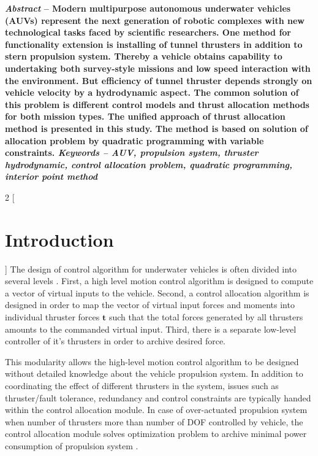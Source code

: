 \documentclass[a0,portrait]{a0poster}
\begin{document}
\begin{minipage}[t]{0.48\linewidth}
\textbf{\textit{Abstract} -- Modern multipurpose autonomous underwater vehicles (AUVs) represent the next generation of robotic complexes with new technological tasks faced by scientific researchers. One method for functionality extension is installing of tunnel thrusters in addition to stern propulsion system. Thereby a vehicle obtains capability to undertaking both survey-style missions and low speed interaction with the environment. But efficiency of tunnel thruster depends strongly on vehicle velocity by a hydrodynamic aspect. The common solution of this problem is different control models and thrust allocation methods for both mission types. The unified approach of thrust allocation method is presented in this study. The method is based on solution of allocation problem by quadratic programming with variable constraints.
\newline
\textit{Keywords -- AUV, propulsion system, thruster hydrodynamic, control allocation problem, quadratic programming, interior point method}}

\color{SaddleBrown}

\begin{multicols}{2}
[
\section*{Introduction}
]
The design of control algorithm for underwater vehicles is often divided into several levels \cite{survey}. First, a high level motion control algorithm is designed to compute a vector of virtual inputs to the vehicle. Second, a control allocation algorithm is designed in order to map the vector of virtual input forces and moments into individual thruster forces $\boldsymbol{t}$ such that the total forces generated by all thrusters amounts to the commanded virtual input. Third, there is a separate low-level controller of it's thrusters in order to archive desired force.

This modularity allows the high-level motion control algorithm to be designed without detailed knowledge about the vehicle propulsion system. In addition to coordinating the effect of different thrusters in the system, issues such as thruster/fault tolerance, redundancy and control constraints are typically handed within the control allocation module. In case of over-actuated propulsion system when number of thrusters more than number of DOF controlled by vehicle, the control allocation module solves optimization problem to archive minimal power consumption of propulsion system \cite{load_balancing}.
\end{multicols}


\end{minipage}
\end{document}
